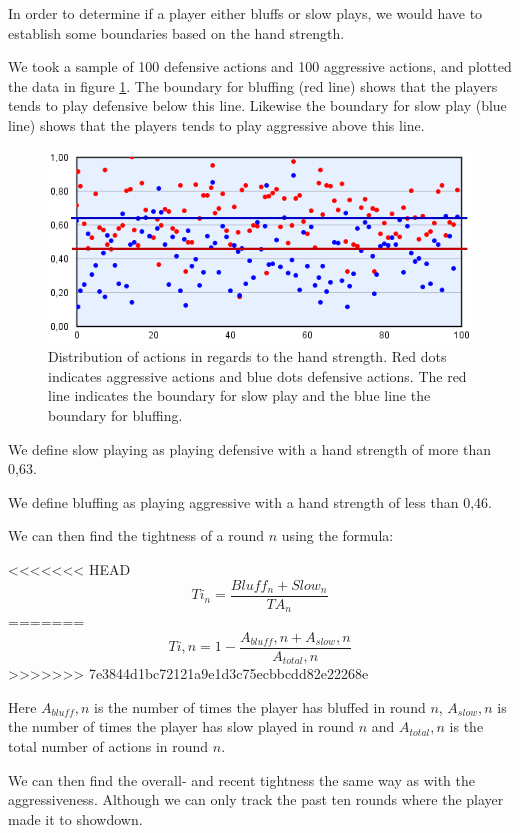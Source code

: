 In order to determine if a player either bluffs or slow plays, we would have to establish some boundaries based on the hand strength. 

We took a sample of 100 defensive actions and 100 aggressive actions, and plotted the data in figure \ref{fig:dist-act}. The boundary for bluffing (red line) shows that the players tends to play defensive below this line. Likewise the boundary for slow play (blue line) shows that the players tends to play aggressive above this line.

\begin{figure}[H]
  \center
    \includegraphics[scale=0.775]{images/modeling/action-dist.png}
  \caption{Distribution of actions in regards to the hand strength. Red dots indicates aggressive actions and blue dots defensive actions. The red line indicates the boundary for slow play and the blue line the boundary for bluffing. \label{fig:dist-act}}
\end{figure}

We define slow playing as playing defensive with a hand strength of more than 0,63.

We define bluffing as playing aggressive with a hand strength of less than 0,46.

We can then find the tightness of a round $n$ using the formula:

<<<<<<< HEAD
\[Ti_{n} = \frac{Bluff_{n} + Slow_{n}}{TA_{n}}\]
=======
\[Ti,n = 1 - \frac{A_{bluff},n + A_{slow},n}{A_{total},n}\]
>>>>>>> 7e3844d1bc72121a9e1d3c75ecbbcdd82e22268e

Here $A_{bluff},n$ is the number of times the player has bluffed in round $n$, $A_{slow},n$ is the number of times the player has slow played in round $n$ and $A_{total},n$ is the total number of actions in round $n$.

We can then find the overall- and recent tightness the same way as with the aggressiveness. Although we can only track the past ten rounds where the player made it to showdown.\\

